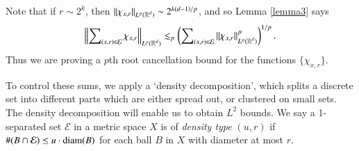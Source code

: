 \begin{remark}
    Note that if $r \sim 2^k$, then $\| \chi_{x,r} \|_{L^p(\operatorname{\mathbb{R}}^d)} \sim 2^{k(d-1)/p}$, and so Lemma \ref{lemma3} says
    \begin{equation}
      \left\| \sum\nolimits_{(x,r) \in \mathcal{E}} \chi_{x,r} \right\|_{L^p(\operatorname{\mathbb{R}}^d)} \lesssim_p \left( \sum\nolimits_{(x,r) \in \mathcal{E}} \| \chi_{x,r} \|_{L^p(\operatorname{\mathbb{R}}^d)}^p \right)^{1/p}.
    \end{equation}
    Thus we are proving a $p$th root cancellation bound for the functions $\{ \chi_{x,r} \}$.
\end{remark}

\begin{comment}
\begin{proof}[Proof of Lemma \ref{lemma2} from Lemma \ref{lemma3}]
    Let
    \[ F = \sum\nolimits_{(x,r) \in \mathcal{E}} \chi_{x,r} \]
    and then for $k \geq 1$, let
    \[ F_k = \sum\nolimits_{(x,r) \in \mathcal{E}_k} \chi_{x,r}. \]
    Then $F = \sum\nolimits_k F_k$, and. Applying a dyadic interpolation result (Lemma 2.2 of that paper), the bound
    \[ \| F_k \|_{L^r(\RR^d)} \lesssim 2^k (2^{k(d-r-1)} \#(\mathcal{E}_k)^{1/r}) \]
    which holds for $r$ to the left and right of $p$, can be interpolated to yield that
    \[ \| F \|_{L^p(\RR^d)} \lesssim \left( \sum\nolimits_k 2^{kp} ( 2^{k(d-r-1)} ) \right)^{1/p} \]


    Applying a dyadic interpolation result (Lemma 2.2 of the paper), Lemma \ref{lemma3} implies that
    \[ \left\| \sum\nolimits_{(x,r) \in \mathcal{E}} \chi_{x,r} \right\| \]

    \[ \left\| \sum\nolimits_{(x,r) \in \mathcal{E}} \chi_{x,r} \right\|_{L^p(\RR^d)} \lesssim \left( \sum 2^{kp} 2^{k(d-p-1)} \#(\mathcal{E}_k) \right)^{1/p} = \left( \sum 2^{k(d-1)} \#(\mathcal{E}_k) \right)^{1/p} \]
    This is a restricted strong type bound for Lemma \ref{lemma2}, which we can then interpolate.
\end{proof}
\end{comment}

To control these sums, we apply a `density decomposition', which splits a discrete set into different parts which are either spread out, or clustered on small sets. The density decomposition will enable us to obtain $L^2$ bounds. We say a 1-separated set $\mathcal{E}$ in a metric space $X$ is of \emph{density type} $(u,r)$ if $\#(B \cap \mathcal{E}) \leq u \cdot \operatorname{\text{diam}}(B)$ for each ball $B$ in $X$ with diameter at most $r$.

